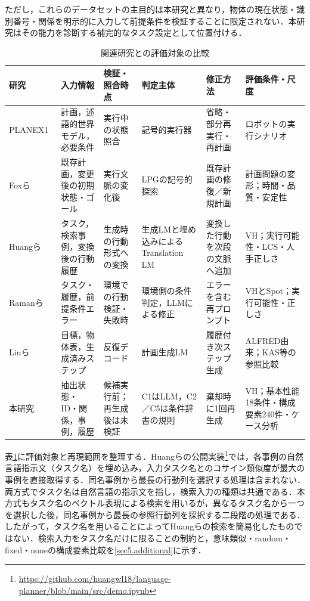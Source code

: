 ただし，これらのデータセットの主目的は本研究と異なり，物体の現在状態・識別番号・関係を明示的に入力して前提条件を検証することに限定されない．本研究はその能力を診断する補完的なタスク設定として位置付ける．

\begin{table}[tb]
\caption{関連研究との評価対象の比較}\label{tab:related_comparison}
\centering\small
\setlength{\tabcolsep}{3pt}
\begin{tabular}{p{}p{}p{}p{}p{}p{}}
\hline
研究 & 入力情報 & 検証・照合時点 & 判定主体 & 修正方法 & 評価条件・尺度 \\
\hline
PLANEX1~\cite{fikes1971planex} & 計画，述語的世界モデル，必要条件 & 実行中の状態照合 & 記号的実行器 & 省略・部分再実行・再計画 & ロボットの実行シナリオ \\
Foxら~\cite{fox2006stability} & 既存計画，変更後の初期状態・ゴール & 実行文脈の変化後 & LPGの記号的探索 & 既存計画の修復／新規計画 & 計画問題の変形；時間・品質・安定性 \\
Huangら~\cite{huang22} & タスク，検索事例，変換後の行動履歴 & 生成時の行動形式への変換 & 生成LMと埋め込みによるTranslation LM & 変換した行動を次段の文脈へ追加 & VH；実行可能性・LCS・人手正しさ \\
Ramanら~\cite{raman2024cape} & タスク・履歴，前提条件エラー & 環境での行動検証・失敗時 & 環境側の条件判定，LLMによる修正 & エラーを含む再プロンプト & VHとSpot；実行可能性・正しさ \\
Linら~\cite{lin2023grounded} & 目標，物体表，生成済みステップ & 反復デコード & 計画生成LM & 履歴付き次ステップ生成 & ALFRED由来；KAS等の参照比較 \\
本研究 & 抽出状態・ID・関係，事例，履歴 & 候補実行前；再生成後は未検証 & C1はLLM，C2／C5は条件辞書の規則 & 棄却時に1回再生成 & VH；基本性能18条件・構成要素240件・ケース分析 \\
\hline
\end{tabular}
\end{table}

表\ref{tab:related_comparison}に評価対象と再現範囲を整理する．Huangらの公開実装\footnote{\url{https://github.com/huangwl18/language-planner/blob/main/src/demo.ipynb}}では，各事例の自然言語指示文（タスク名）を埋め込み，入力タスク名とのコサイン類似度が最大の事例を直接取得する．同名事例から最長の行動列を選択する処理は含まれない．両方式でタスク名は自然言語の指示文を指し，検索入力の種類は共通である．本方式もタスク名のベクトル表現による検索を用いるが，異なるタスク名から一つを選択した後，同名事例から最長の参照行動列を採択する二段階の処理である．したがって，タスク名を用いることによってHuangらの検索を簡易化したものではない．検索入力をタスク名だけに限ることの制約と，意味類似・random・fixed・noneの構成要素比較を\ref{sec5.additional}に示す．
